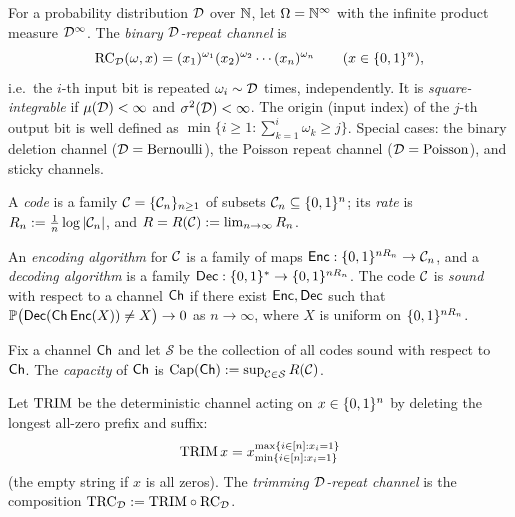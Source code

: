 \begin{definition}
  \label{def:repeat-channel}
  For a probability distribution $\mathcal{D}$ over $\mathbb{N}$, let $\Omega = \mathbb{N}^\infty$
  with the infinite product measure $\mathcal{D}^\infty$. The \emph{binary
  $\mathcal{D}$-repeat channel} is
  \[
    \mathrm{RC}_{\mathcal{D}}(\omega,x) = (x_1)^{\omega_1}(x_2)^{\omega_2}\cdots(x_n)^{\omega_n}
    \qquad (x \in \{0,1\}^n),
  \]
  i.e.\ the $i$-th input bit is repeated $\omega_i \sim \mathcal{D}$ times,
  independently. It is \emph{square-integrable} if $\mu(\mathcal{D})<\infty$ and
  $\sigma^2(\mathcal{D})<\infty$. The origin (input index) of the $j$-th output bit is
  well defined as $\min\{i \ge 1 : \sum_{k=1}^i \omega_k \ge j\}$. Special cases:
  the binary deletion channel ($\mathcal{D}=\mathrm{Bernoulli}$), the Poisson repeat
  channel ($\mathcal{D}=\mathrm{Poisson}$), and sticky channels.
\end{definition}

\begin{definition}
  \label{def:code}
  A \emph{code} is a family $\mathcal{C} = \{\mathcal{C}_n\}_{n\ge1}$ of subsets
  $\mathcal{C}_n \subseteq \{0,1\}^n$; its \emph{rate} is $R_n := \tfrac1n \log|\mathcal{C}_n|$,
  and $R = R(\mathcal{C}) := \lim_{n\to\infty} R_n$.
\end{definition}

\begin{definition}
  \label{def:sound}
  An \emph{encoding algorithm} for $\mathcal{C}$ is a family of maps
  $\mathsf{Enc} : \{0,1\}^{nR_n} \to \mathcal{C}_n$, and a \emph{decoding algorithm} is a family
  $\mathsf{Dec} : \{0,1\}^* \to \{0,1\}^{nR_n}$. The code $\mathcal{C}$ is \emph{sound} with respect
  to a channel $\mathsf{Ch}$ if there exist $\mathsf{Enc},\mathsf{Dec}$ such that
  $\mathbb{P}\big(\mathsf{Dec}(\mathsf{Ch}\,\mathsf{Enc}(X)) \ne X\big) \to 0$ as $n\to\infty$, where $X$ is
  uniform on $\{0,1\}^{nR_n}$.
\end{definition}

\begin{definition}
  \label{def:capacity}
  Fix a channel $\mathsf{Ch}$ and let $\mathcal{S}$ be the collection of all codes sound
  with respect to $\mathsf{Ch}$. The \emph{capacity} of $\mathsf{Ch}$ is
  $\mathrm{Cap}(\mathsf{Ch}) := \sup_{\mathcal{C}\in\mathcal{S}} R(\mathcal{C})$.
\end{definition}

\begin{definition}
  \label{def:trim}
  Let $\mathrm{TRIM}$ be the deterministic channel acting on $x\in\{0,1\}^n$ by deleting
  the longest all-zero prefix and suffix:
  \[
    \mathrm{TRIM}\,x = x_{\min\{i\in[n]:x_i=1\}}^{\max\{i\in[n]:x_i=1\}}
  \]
  (the empty string if $x$ is all zeros). The \emph{trimming $\mathcal{D}$-repeat
  channel} is the composition $\mathrm{TRC}_{\mathcal{D}} := \mathrm{TRIM} \circ \mathrm{RC}_{\mathcal{D}}$.
\end{definition}

